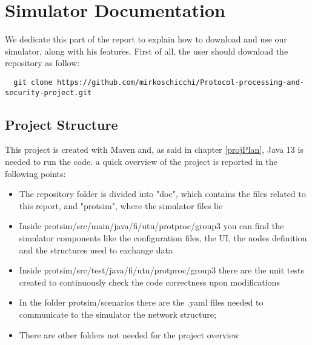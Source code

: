 \chapter{Simulator Documentation}\label{simulatorDoc}
We dedicate this part of the report to explain how to download and use our simulator, along with his features.\newline
First of all, the user should download the repository as follow:
\begin{verbatim}
  git clone https://github.com/mirkoschicchi/Protocol-processing-and-security-project.git
\end{verbatim}

\section{Project Structure}
This project is created with Maven and, as said in chapter \ref{projPlan}, Java 13 is needed to run the code.\newline
a quick overview of the project is reported in the following points:
\begin{itemize}
  \item The repository folder is divided into "doc", which contains the files related to this report, and "protsim", where the simulator files lie
  \item Inside protsim/src/main/java/fi/utu/protproc/group3 you can find the simulator components like the configuration files, the UI, the nodes definition and the structures used to exchange data
  \item Inside protsim/src/test/java/fi/utu/protproc/group3 there are the unit tests created to continuously check the code correctness upon modifications
  \item In the folder protsim/scenarios there are the .yaml files needed to communicate to the simulator the network structure;
  \item There are other folders not needed for the project overview
\end{itemize}


